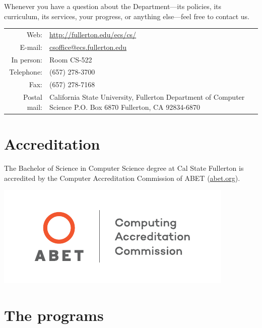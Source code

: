 \documentclass{book}
\begin{document}
Whenever you have a question about the Department---its policies, its curriculum, its services, your progress, or anything else---feel free to contact us.

\begin{tabular}{rp{6in}} %
  Web: & \href{http://fullerton.edu/ecs/cs/}{http://fullerton.edu/ecs/cs/} \\ \index{website}
  E-mail: & \href{mailto:csoffice@ecs.fullerton.edu}{csoffice@ecs.fullerton.edu} \\ \index{e-mail}
  In person: & Room CS-522 \\ \index{department office}
  Telephone: & (657) 278-3700 \\ \index{phone number} \index{telephone number}
  Fax: & (657) 278-7168 \\ \index{fax number}
  Postal mail: & California State University, Fullerton \newline \index{postal address} \index{address}
Department of Computer Science \newline
P.O. Box 6870 \newline
Fullerton, CA 92834-6870
\end{tabular}

\section{Accreditation} 

The Bachelor of Science in Computer Science degree at Cal State Fullerton is accredited by the Computer Accreditation Commission of ABET (\href{http://www.abet.org}{abet.org}).

\begin{center}
  \includegraphics{CAC-CMYK-W.pdf}
\end{center}

\section{The programs}
\end{document}
